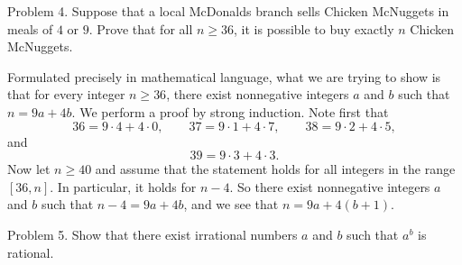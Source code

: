 % 

\proclaim Problem 4. Suppose that a local McDonalds branch sells Chicken McNuggets in meals of $4$
or $9$. Prove that for all $n\ge 36$, it is possible to buy exactly $n$ Chicken McNuggets.

\proof Formulated precisely in mathematical language, what we are trying to show is that for every
integer $n\ge 36$, there exist nonnegative integers $a$ and $b$ such that $n=9a + 4b$.
We perform a proof by strong induction. Note first that
$$ 36 = 9\cdot 4 + 4\cdot 0, \qquad 37 = 9\cdot 1 + 4\cdot 7, \qquad
38 = 9\cdot 2 + 4\cdot 5,$$
and
$$39 = 9\cdot 3 + 4\cdot 3.$$
Now let $n\ge 40$ and assume that the statement holds for all integers in the range $[36, n]$.
In particular, it holds for $n-4$. So there exist nonnegative integers $a$ and $b$ such that
$n-4 = 9a + 4b$, and we see that $n = 9a + 4(b+1)$.\slug

\proclaim Problem 5. Show that there exist irrational numbers $a$ and $b$ such that $a^b$ is rational.

